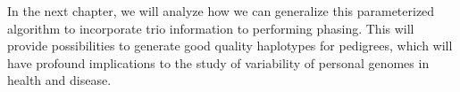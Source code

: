% 	
	
	In the next chapter, we will analyze how we can generalize this parameterized algorithm to incorporate trio information to performing phasing. 
	This will provide possibilities to generate good quality haplotypes for pedigrees, which will have profound implications to the study of variability of personal genomes in health and disease.




% 
% 





